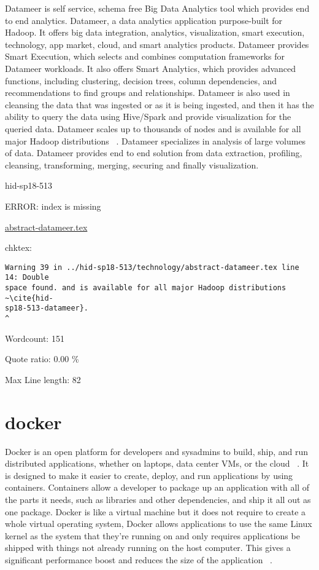 Datameer is self service, schema free Big Data Analytics tool which provides 
end to end analytics. Datameer, a data analytics application purpose-built for 
Hadoop. It offers big data integration, analytics, visualization, smart 
execution, technology, app market, cloud, and smart analytics products. 
Datameer provides Smart Execution, which selects and combines computation 
frameworks for Datameer workloads. It also offers Smart Analytics, which 
provides advanced functions, including clustering, decision trees, column 
dependencies, and recommendations to find groups and relationships. Datameer is
also used in cleansing the data that was ingested or as it is being ingested, 
and then it has the ability to query the data using Hive/Spark and provide 
visualization for the queried data. Datameer scales up to thousands of nodes
and is available for all major Hadoop distributions ~\cite{hid-sp18-513-datameer}.
Datameer specializes in analysis of large volumes of data. Datameer provides 
end to end solution from data extraction, profiling, cleansing, transforming,
merging, securing and finally visualization. 


\begin{IU}

hid-sp18-513

ERROR: index is missing

\href{https://github.com/cloudmesh-community/hid-sp18-513/blob/master//technology/abstract-datameer.tex}{abstract-datameer.tex}

 
chktex:
\begin{tiny}
\begin{verbatim}
Warning 39 in ../hid-sp18-513/technology/abstract-datameer.tex line 14: Double
space found. and is available for all major Hadoop distributions ~\cite{hid-
sp18-513-datameer}.                                                      ^
\end{verbatim}
\end{tiny}

Wordcount: 151


Quote ratio: 0.00 \%
 
Max Line length: 82
\end{IU}

\section{docker}
Docker is an open platform for developers and sysadmins to build, ship, 
and run distributed applications, whether on laptops, data center VMs, 
or the cloud ~\cite{hid-sp18-513-docker}. It is designed to make it easier to
create, deploy, and run applications by using containers. Containers allow a 
developer to package up an application with all of the parts it needs, 
such as libraries and other dependencies, and ship it all out as one package. 
Docker is like a virtual machine but it does not require to create a whole 
virtual operating system, Docker allows applications to use the same Linux 
kernel as the system that they're running on and only requires applications 
be shipped with things not already running on the host computer. This gives 
a significant performance boost and reduces the size of the application 
~\cite{hid-sp18-513-opensource}.



